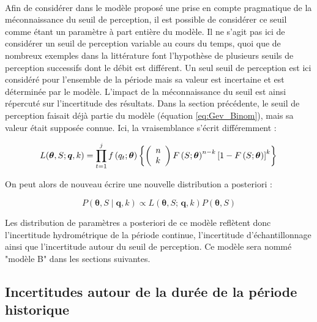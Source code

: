 \documentclass[11pt]{article}
\begin{document}
		\paragraph{}
		Afin de considérer dans le modèle proposé une prise en compte pragmatique de la méconnaissance du seuil de perception, il est possible de considérer ce seuil comme étant un paramètre à part entière du modèle. Il ne s'agit pas ici de considérer un seuil de perception variable au cours du temps, quoi que de nombreux exemples dans la littérature font l'hypothèse de plusieurs seuils de perception successifs dont le débit est différent. Un seul seuil de perception est ici considéré pour l'ensemble de la période mais sa valeur est incertaine et est déterminée par le modèle. L'impact de la méconnaissance du seuil est ainsi répercuté sur l'incertitude des résultats. Dans la section précédente, le seuil de perception faisait déjà partie du modèle (équation \ref{eq:Gev_Binom}), mais sa valeur était supposée connue. Ici, la vraisemblance s'écrit différemment : 
		
				\begin{equation}
				L(\boldsymbol{\theta}, S ; \boldsymbol{q}, k) =\prod_{t=1}^j f\left(q_t;\boldsymbol{\theta}\right) \left\{\left(\begin{array}{l}
				n \\
				k
				\end{array}\right) F\left(S;\boldsymbol{\theta}\right)^{n-k}\left[1-F\left(S;\boldsymbol{\theta}\right)\right]^k\right\} \\
				\label{eq:Gev_Binom_uS}
				\end{equation}
				
		On peut alors de nouveau écrire une nouvelle distribution a posteriori : 			
				
				\begin{equation}
					P(\boldsymbol{\theta}, S \mid \boldsymbol{q},k) \propto L(\boldsymbol{\theta},S;\,\boldsymbol{q},k) P(\boldsymbol{\theta},S)
					\label{eq:Bayes_uS}
				\end{equation}
			
		Les distribution de paramètres a posteriori de ce modèle reflètent donc l'incertitude hydrométrique de la période continue, l'incertitude d'échantillonnage ainsi que l'incertitude autour du seuil de perception. Ce modèle sera nommé "modèle B" dans les sections suivantes.
		

	\subsection{Incertitudes autour de la durée de la période historique}
	
\end{document}

